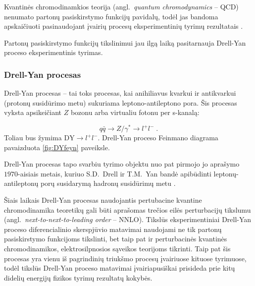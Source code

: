 \documentclass[a4paper, 12pt]{article}
\newcommand{\DY}{\mathrm{DY}}
\newlength\q
\begin{document}
\begin{centering}
\begin{minipage}[t]{0.48\linewidth}
	\end{minipage}
	\vspace{-0.3cm}
\end{centering}

Kvantinės chromodinamkios teorija (angl.\ \textit{quantum chromodynamics} -- QCD) nenumato
partonų pasiskirstymo funkcijų pavidalų, todėl jas bandoma apskaičiuoti pasinaudojant įvairių
procesų eksperimentinių tyrimų rezultatais \cite{PDF0}.

Partonų pasiskirstymo funkcijų tikslinimui jau ilgą laiką pasitarnauja Drell-Yan proceso eksperimentinis
tyrimas. 


\subsubsection{Drell-Yan procesas}

Drell-Yan procesas -- tai toks procesas, kai anihiliavus kvarkui ir antikvarkui (protonų susidūrimo
metu) sukuriama leptono-antileptono pora.
Šis procesas vyksta apsikeičiant $Z$ bozonu arba
virtualiu fotonu per s-kanalą:

\begin{equation*}
	q\bar{q} \rightarrow Z/ \gamma^{*} \rightarrow l^{+}l^{-} \; .
\end{equation*}
Toliau bus žymima $\DY \! \rightarrow \! l^{+}l^{-}$. Drell-Yan proceso Feinmano diagrama
pavaizduota \ref{fig:DYfeyn} paveiksle.

Drell-Yan procesas tapo svarbiu tyrimo objektu nuo pat pirmojo jo aprašymo $1970$-aisiais
metais, kuriuo S.D.\ Drell ir T.M.\ Yan bandė apibūdinti leptonų-antileptonų porų susidarymą
hadronų susidūrimų metu \cite{DYoriginal}.

Šiais laikais Drell-Yan procesas naudojantis pertubacine kvantine chromodinamika teoretikų
gali būti aprašomas trečios eilės perturbacijų tikslumu (angl.\ \textit{next-to-next-to-leading
order} -- NNLO).
Tikslūs eksperimentiniai Drell-Yan proceso diferencialinio skerspjūvio matavimai naudojami
ne tik partonų pasiskirstymo funkcijoms tikslinti, bet taip pat ir perturbacinės kvantinės
chromodinamikos, elektrosilpnosios sąveikos teorijoms tikrinti. Taip pat šis procesas yra vienu iš
pagrindinių triukšmo procesų įvairiuose kituose tyrimuose, todėl tikslūs Drell-Yan proceso matavimai
įvairiapusiškai prisideda prie kitų didelių energijų fizikos tyrimų rezultatų kokybės.
\end{document}
